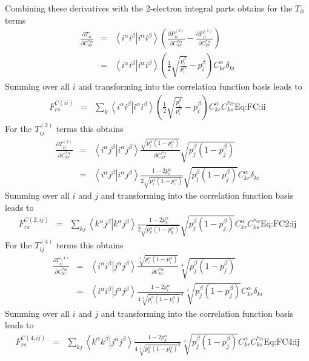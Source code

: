 \documentclass[pra,nofootinbib]{revtex4-1}
\newcommand{\eria}[4]{\left\langle #1^\alpha #2^\beta \right.\left| #3^\alpha #4^\beta \right\rangle}
\newcommand{\dlabel}[1]{\text{#1}\label{#1}}
\begin{document}
Combining these derivatives with the 2-electron integral parts obtains
for the $T_{ii}$ terms
\begin{eqnarray}
   \frac{\partial T_{ii}}{\partial C^{*\alpha}_{kr}}
   &=& \eria{i}{i}{i}{i}\left( 
           \frac{\partial P^{(2)}_{ii}}{\partial C^{*\alpha}_{kr}}
          -\frac{\partial P^{(1)}_{ii}}{\partial C^{*\alpha}_{kr}}
       \right) \\
   &=& \eria{i}{i}{i}{i}\left(
           \frac{1}{2}\sqrt{\frac{p^\beta_i}{p^\alpha_i}}
          -p^\beta_i
       \right) C^\alpha_{kr}\delta_{ki}
\end{eqnarray}
Summing over all $i$ and transforming into the correlation function
basis leads to
\begin{eqnarray}
   F^{C(ii)}_{rs}
   &=& \sum_{k}\eria{i}{i}{i}{i}\left(
           \frac{1}{2}\sqrt{\frac{p^\beta_i}{p^\alpha_i}}
          -p^\beta_i
       \right)C^\alpha_{kr}C^{*\alpha}_{ks}
       \dlabel{Eq:FC:ii}
\end{eqnarray}
For the $T^{(2)}_{ij}$ terms this obtains
\begin{eqnarray}
   \frac{\partial T^{(2)}_{ij}}{\partial C^{*\alpha}_{kr}}
   &=& \eria{i}{j}{i}{j}
       \frac{\sqrt{p_i^\alpha(1-p_i^\alpha)}}{\partial C^{*\alpha}_{kr}}
       \sqrt{p_j^\beta(1-p_j^\beta)} \\
   &=& \eria{i}{j}{i}{j}
       \frac{1-2p_i^\alpha}{2\sqrt{p_i^\alpha(1-p_i^\alpha)}}
       \sqrt{p_j^\beta(1-p_j^\beta)} 
       C^\alpha_{kr}\delta_{ki}
\end{eqnarray}
Summing over all $i$ and $j$ and transforming into the correlation
function basis leads to
\begin{eqnarray}
   F^{C(2,ij)}_{rs}
   &=& \sum_{kj}\eria{k}{j}{k}{j}
       \frac{1-2p_k^\alpha}{2\sqrt{p_k^\alpha(1-p_k^\alpha)}}
       \sqrt{p_j^\beta(1-p_j^\beta)} 
       C^\alpha_{kr}C^{*\alpha}_{ks}
       \dlabel{Eq:FC2:ij}
\end{eqnarray}
For the $T^{(4)}_{ij}$ terms this obtains
\begin{eqnarray}
   \frac{\partial T^{(4)}_{ij}}{\partial C^{*\alpha}_{kr}}
   &=& \eria{i}{i}{j}{j}
       \frac{\sqrt[4]{p_i^\alpha(1-p_i^\alpha)}}{\partial C^{*\alpha}_{kr}}
       \sqrt[4]{p_j^\beta(1-p_j^\beta)} \\
   &=& \eria{i}{i}{j}{j}
       \frac{1-2p_i^\alpha}{4\sqrt[4]{p_i^\alpha(1-p_i^\alpha)}^3}
       \sqrt[4]{p_j^\beta(1-p_j^\beta)} 
       C^\alpha_{kr}\delta_{ki}
\end{eqnarray}
Summing over all $i$ and $j$ and transforming into the correlation
function basis leads to
\begin{eqnarray}
   F^{C(4,ij)}_{rs}
   &=& \sum_{kj}\eria{k}{k}{j}{j}
       \frac{1-2p_k^\alpha}{4\sqrt[4]{p_k^\alpha(1-p_k^\alpha)}^3}
       \sqrt[4]{p_j^\beta(1-p_j^\beta)}
       C^\alpha_{kr}C^{*\alpha}_{ks}
       \dlabel{Eq:FC4:ij}
\end{eqnarray}
\end{document}
